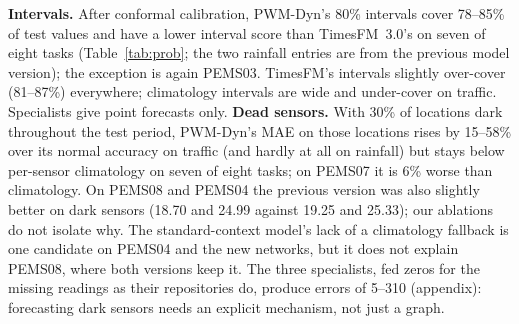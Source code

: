 \textbf{Intervals.} After conformal calibration, PWM-Dyn's 80\% intervals cover 78--85\% of test values and have a
lower interval score than TimesFM~3.0's on seven of eight tasks (Table~\ref{tab:prob}; the two rainfall entries are
from the previous model version); the exception is again PEMS03. TimesFM's intervals slightly over-cover (81--87\%)
everywhere; climatology intervals are wide and under-cover on traffic. Specialists give point forecasts only.
\textbf{Dead sensors.} With 30\% of locations dark throughout the test period, PWM-Dyn's MAE on those locations rises
by 15--58\% over its normal accuracy on traffic (and hardly at all on rainfall) but stays below per-sensor climatology
on seven of eight tasks; on PEMS07 it is 6\% worse than climatology. On PEMS08 and PEMS04 the previous version was
also slightly better on dark sensors (18.70 and 24.99 against 19.25 and 25.33); our ablations do not isolate why. The
standard-context model's lack of a climatology fallback is one candidate on PEMS04 and the new networks, but it does
not explain PEMS08, where both versions keep it. The three specialists, fed zeros for the missing readings as their
repositories do, produce errors of 5--310 (appendix): forecasting dark sensors needs an explicit mechanism, not just a
graph.
